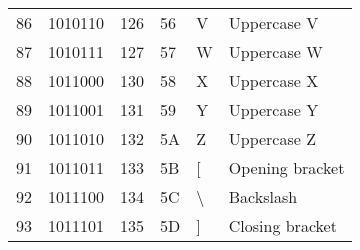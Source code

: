 \begin{center}
\begin{longtable}{llllll}
\rowcolor[HTML]{F3F6F6} 
{\color[HTML]{404040} 86}               & {\color[HTML]{404040} 1010110}         & {\color[HTML]{404040} 126}            & {\color[HTML]{404040} 56}                   & {\color[HTML]{404040} V}                  & {\color[HTML]{404040} Uppercase V}                           \\
\rowcolor[HTML]{FCFCFC} 
{\color[HTML]{404040} 87}               & {\color[HTML]{404040} 1010111}         & {\color[HTML]{404040} 127}            & {\color[HTML]{404040} 57}                   & {\color[HTML]{404040} W}                  & {\color[HTML]{404040} Uppercase W}                           \\
\rowcolor[HTML]{F3F6F6} 
{\color[HTML]{404040} 88}               & {\color[HTML]{404040} 1011000}         & {\color[HTML]{404040} 130}            & {\color[HTML]{404040} 58}                   & {\color[HTML]{404040} X}                  & {\color[HTML]{404040} Uppercase X}                           \\
\rowcolor[HTML]{FCFCFC} 
{\color[HTML]{404040} 89}               & {\color[HTML]{404040} 1011001}         & {\color[HTML]{404040} 131}            & {\color[HTML]{404040} 59}                   & {\color[HTML]{404040} Y}                  & {\color[HTML]{404040} Uppercase Y}                           \\
\rowcolor[HTML]{F3F6F6} 
{\color[HTML]{404040} 90}               & {\color[HTML]{404040} 1011010}         & {\color[HTML]{404040} 132}            & {\color[HTML]{404040} 5A}                   & {\color[HTML]{404040} Z}                  & {\color[HTML]{404040} Uppercase Z}                           \\
\rowcolor[HTML]{FCFCFC} 
{\color[HTML]{404040} 91}               & {\color[HTML]{404040} 1011011}         & {\color[HTML]{404040} 133}            & {\color[HTML]{404040} 5B}                   & {\color[HTML]{404040} {[}}                & {\color[HTML]{404040} Opening bracket}                       \\
\rowcolor[HTML]{F3F6F6} 
{\color[HTML]{404040} 92}               & {\color[HTML]{404040} 1011100}         & {\color[HTML]{404040} 134}            & {\color[HTML]{404040} 5C}                   & {\color[HTML]{404040} \textbackslash{}}   & {\color[HTML]{404040} Backslash}                             \\
\rowcolor[HTML]{FCFCFC} 
{\color[HTML]{404040} 93}               & {\color[HTML]{404040} 1011101}         & {\color[HTML]{404040} 135}            & {\color[HTML]{404040} 5D}                   & {\color[HTML]{404040} {]}}                & {\color[HTML]{404040} Closing bracket}                       \\

\end{longtable}
\end{center}
